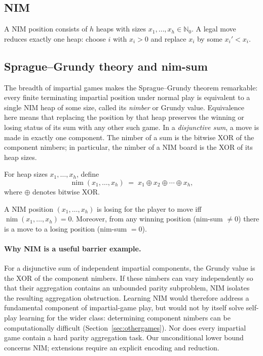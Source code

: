 \documentclass[twoside,11pt]{article}
\newcommand{\N}{\mathbb{N}}
\numberwithin{theorem}{section}
\numberwithin{equation}{section}
\begin{document}
\subsection{NIM}
\begin{definition}[NIM]
\label{def:nim}
A NIM position consists of $h$ heaps with sizes $x_1,\dots,x_h\in\N_0$. A legal move reduces exactly one heap: choose $i$ with $x_i>0$ and replace $x_i$ by some $x_i'<x_i$.
\end{definition}

\subsection{Sprague--Grundy theory and nim-sum}
The breadth of impartial games makes the Sprague--Grundy theorem remarkable: every finite terminating impartial position under normal play is equivalent to a single NIM heap of some size, called its \emph{nimber} or Grundy value. Equivalence here means that replacing the position by that heap preserves the winning or losing status of its sum with any other such game. In a \emph{disjunctive sum}, a move is made in exactly one component. The nimber of a sum is the bitwise XOR of the component nimbers; in particular, the nimber of a NIM board is the XOR of its heap sizes.

\begin{definition}
\label{def:nimsum}
For heap sizes $x_1,\dots,x_h$, define
\[
\operatorname{nim}(x_1,\dots,x_h) \;=\; x_1 \oplus x_2 \oplus \cdots \oplus x_h,
\]
where $\oplus$ denotes bitwise XOR.
\end{definition}

\begin{theorem}
\label{thm:nim-win}
A NIM position $(x_1,\dots,x_h)$ is losing for the player to move iff $\operatorname{nim}(x_1,\dots,x_h)=0$. Moreover, from any winning position (nim-sum $\neq 0$) there is a move to a losing position (nim-sum $=0$).
\end{theorem}

\paragraph{Why NIM is a useful barrier example.}
For a disjunctive sum of independent impartial components, the Grundy value is the XOR of the component nimbers. If these nimbers can vary independently so that their aggregation contains an unbounded parity subproblem, NIM isolates the resulting aggregation obstruction.
Learning NIM would therefore address a fundamental component of impartial-game play, but would not by itself solve self-play learning for the wider class: determining component nimbers can be computationally difficult (Section~\ref{sec:othergames}). Nor does every impartial game contain a hard parity aggregation task. Our unconditional lower bound concerns NIM; extensions require an explicit encoding and reduction.
\end{document}

